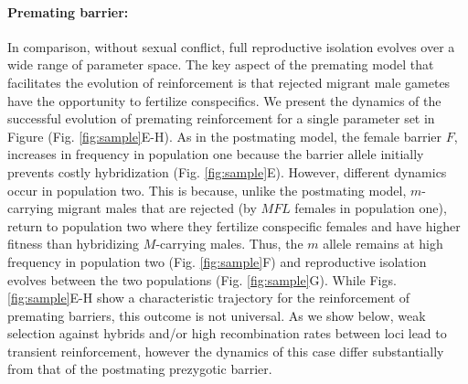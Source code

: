 \documentclass[11pt]{article}
\begin{document}
\paragraph{Premating barrier:} In comparison, without sexual conflict, full reproductive isolation evolves over a wide range of parameter space.  
The key aspect of the premating model that facilitates the evolution of reinforcement is that rejected migrant male gametes have the opportunity to fertilize conspecifics.   
We present the dynamics of the successful evolution of premating reinforcement for a single parameter set in Figure (Fig. \ref{fig:sample}E-H). 
As in the postmating model, the female barrier $F$, increases in frequency in population one because the barrier allele initially prevents costly hybridization (Fig. \ref{fig:sample}E). 
However, different dynamics occur in population two. 
This is because, unlike the postmating model,  $m$-carrying migrant males that are rejected (by $MFL$ females in population one), return to population two where they fertilize conspecific females and have higher fitness than hybridizing $M$-carrying males.  
Thus, the $m$ allele remains at high frequency in population two (Fig. \ref{fig:sample}F) and reproductive isolation evolves between the two populations (Fig. \ref{fig:sample}G).  
While Figs. \ref{fig:sample}E-H show a characteristic trajectory for the reinforcement of premating barriers, this outcome is not universal. 
As we show below, weak selection against hybrids and/or high recombination rates between loci lead to transient reinforcement, however the dynamics of this case differ substantially from that of the postmating prezygotic barrier. 
\end{document}
